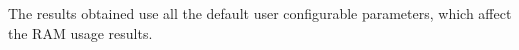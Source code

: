 %

The results obtained use all the default user configurable parameters, which affect the RAM usage results.
